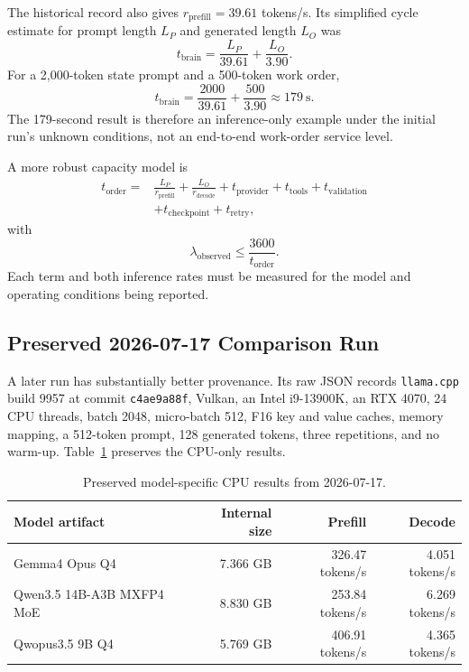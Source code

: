 \documentclass[11pt]{article}
\begin{document}
The historical record also gives $r_{\mathrm{prefill}} = 39.61$ tokens/s. Its simplified cycle estimate for prompt length $L_P$ and generated length $L_O$ was
\[
t_{\mathrm{brain}} = \frac{L_P}{39.61} + \frac{L_O}{3.90}.
\]
For a 2,000-token state prompt and a 500-token work order,
\[
t_{\mathrm{brain}} = \frac{2000}{39.61} + \frac{500}{3.90}
\approx 179\ \text{s}.
\]
The 179-second result is therefore an inference-only example under the initial run's unknown conditions, not an end-to-end work-order service level.
\pagebreak

A more robust capacity model is
\[
\begin{aligned}
t_{\mathrm{order}}={}&\frac{L_P}{r_{\mathrm{prefill}}}
+\frac{L_O}{r_{\mathrm{decode}}}
+t_{\mathrm{provider}}+t_{\mathrm{tools}}+t_{\mathrm{validation}}\\
&+t_{\mathrm{checkpoint}}+t_{\mathrm{retry}},
\end{aligned}
\]
with
\[
\lambda_{\mathrm{observed}} \leq \frac{3600}{t_{\mathrm{order}}}.
\]
Each term and both inference rates must be measured for the model and operating conditions being reported.

\subsection{Preserved 2026-07-17 Comparison Run}

A later run has substantially better provenance. Its raw JSON records \texttt{llama.cpp} build 9957 at commit \texttt{c4ae9a88f}, Vulkan, an Intel i9-13900K, an RTX 4070, 24 CPU threads, batch 2048, micro-batch 512, F16 key and value caches, memory mapping, a 512-token prompt, 128 generated tokens, three repetitions, and no warm-up. Table~\ref{tab:july-cpu} preserves the CPU-only results.

\begin{table}[h]
\centering
\caption{Preserved model-specific CPU results from 2026-07-17.}
\label{tab:july-cpu}
\begin{tabular}{lrrr}
\toprule
Model artifact & Internal size & Prefill & Decode \\
\midrule
Gemma4 Opus Q4 & 7.366 GB & 326.47 tokens/s & 4.051 tokens/s \\
Qwen3.5 14B-A3B MXFP4 MoE & 8.830 GB & 253.84 tokens/s & 6.269 tokens/s \\
Qwopus3.5 9B Q4 & 5.769 GB & 406.91 tokens/s & 4.365 tokens/s \\
\bottomrule
\end{tabular}
\end{table}
\end{document}
